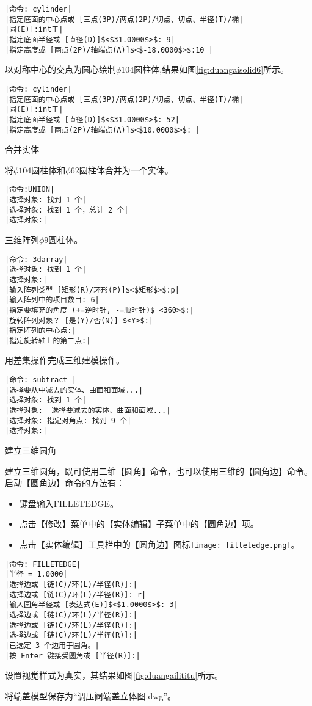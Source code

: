 \begin{procedure}
\begin{lstlisting}
|命令: cylinder|
|指定底面的中心点或 [三点(3P)/两点(2P)/切点、切点、半径(T)/椭|
|圆(E)]:int于|
|指定底面半径或 [直径(D)]$<$31.0000$>$: 9|
|指定高度或 [两点(2P)/轴端点(A)]$<$-18.0000$>$:10 |
\end{lstlisting}
以对称中心的交点为圆心绘制$\phi 104$圆柱体,结果如图\ref{fig:duangaisolid6}所示。
\begin{lstlisting}
|命令: cylinder|
|指定底面的中心点或 [三点(3P)/两点(2P)/切点、切点、半径(T)/椭|
|圆(E)]:int于|
|指定底面半径或 [直径(D)]$<$31.0000$>$: 52|
|指定高度或 [两点(2P)/轴端点(A)]$<$10.0000$>$: |
\end{lstlisting}
\item 合并实体

将$\phi 104$圆柱体和$\phi 62$圆柱体合并为一个实体。
\begin{lstlisting}
|命令:UNION|
|选择对象: 找到 1 个|
|选择对象: 找到 1 个，总计 2 个|
|选择对象:|
\end{lstlisting}
\item 三维阵列$\phi 9$圆柱体。
\begin{lstlisting}
|命令: 3darray|
|选择对象: 找到 1 个|
|选择对象:|
|输入阵列类型 [矩形(R)/环形(P)]$<$矩形$>$:p|
|输入阵列中的项目数目: 6|
|指定要填充的角度 (+=逆时针, -=顺时针)$ <360>$:|
|旋转阵列对象？ [是(Y)/否(N)] $<Y>$:|
|指定阵列的中心点:|
|指定旋转轴上的第二点:|
\end{lstlisting}
\item 用差集操作完成三维建模操作。
\begin{lstlisting}
|命令: subtract |
|选择要从中减去的实体、曲面和面域...|
|选择对象: 找到 1 个|
|选择对象:  选择要减去的实体、曲面和面域...|
|选择对象: 指定对角点: 找到 9 个|
|选择对象:|
\end{lstlisting}
\item 建立三维圆角

建立三维圆角，既可使用二维【圆角】命令，也可以使用三维的【圆角边】命令。启动【圆角边】命令的方法有：
\begin{itemize}
\item 键盘输入FILLETEDGE。
\item 点击【修改】菜单中的【实体编辑】子菜单中的【圆角边】项。
\item 点击【实体编辑】工具栏中的【圆角边】图标\texttt{[image: filletedge.png]}。
\end{itemize} 

\newpage

\begin{lstlisting}
|命令: FILLETEDGE|
|半径 = 1.0000|
|选择边或 [链(C)/环(L)/半径(R)]:|
|选择边或 [链(C)/环(L)/半径(R)]: r|
|输入圆角半径或 [表达式(E)]$<$1.0000$>$: 3|
|选择边或 [链(C)/环(L)/半径(R)]:|  
|选择边或 [链(C)/环(L)/半径(R)]:|
|选择边或 [链(C)/环(L)/半径(R)]:|
|已选定 3 个边用于圆角。|
|按 Enter 键接受圆角或 [半径(R)]:|
\end{lstlisting}
\item 设置视觉样式为真实，其结果如图\ref{fig:duangailititu}所示。
\item 将端盖模型保存为“调压阀端盖立体图.dwg”。
\end{procedure}

